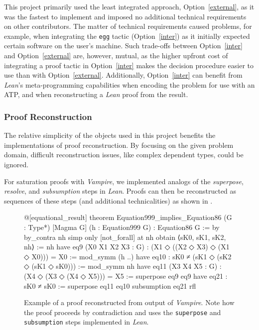 \documentclass[12pt]{amsart}
\theoremstyle{definition}
\begin{document}
This project primarily used the least integrated approach, Option~\ref{external}, as it was the fastest to implement and imposed no additional technical requirements on other contributors.
The matter of technical requirements caused problems, for example, when integrating the \texttt{egg} tactic (Option~\ref{inter}) as it initially expected certain software on the user's machine.
Such trade-offs between Option~\ref{inter} and Option~\ref{external} are, however, mutual, as the higher upfront cost of integrating a proof tactic in Option~\ref{inter} makes the decision procedure easier to use than with Option~\ref{external}.
Additionally, Option~\ref{inter} can benefit from \emph{Lean}'s meta-programming capabilities when encoding the problem for use with an ATP, and when reconstructing a \emph{Lean} proof from the result.

\subsubsection{Proof Reconstruction}
The relative simplicity of the objects used in this project benefits the implementations of proof reconstruction.
By focusing on the given problem domain, difficult reconstruction issues, like complex dependent types, could be ignored.

For saturation proofs with \emph{Vampire}, we implemented analogs of the \emph{superpose}, \emph{resolve}, and \emph{subsumption} steps in \emph{Lean}.
Proofs can then be reconstructed as sequences of these steps (and additional technicalities) as shown in .

\begin{figure}
\centering
\begin{lean}
@[equational_result] theorem Equation999_implies_Equation86
    (G : Type*) [Magma G] (h : Equation999 G) : Equation86 G := by
  by_contra nh
  simp only [not_forall] at nh
  obtain ⟨sK0, sK1, sK2, nh⟩ := nh
  have eq9 (X0 X1 X2 X3 : G) : (X1 ◇ ((X2 ◇ X3) ◇ (X1 ◇ X0))) = X0 :=
    mod_symm (h ..)
  have eq10 : sK0 ≠ (sK1 ◇ (sK2 ◇ (sK1 ◇ sK0))) := mod_symm nh
  have eq11 (X3 X4 X5 : G) : (X4 ◇ (X3 ◇ (X4 ◇ X5))) = X5 := superpose eq9 eq9
  have eq21 : sK0 ≠ sK0 := superpose eq11 eq10
  subsumption eq21 rfl
\end{lean}
\caption{Example of a proof reconstructed from output of \emph{Vampire}. Note how the proof proceeds by contradiction and uses the \texttt{superpose} and \texttt{subsumption} steps implemented in \emph{Lean}.}
\label{fig:vampire-example}
\end{figure}
\end{document}
